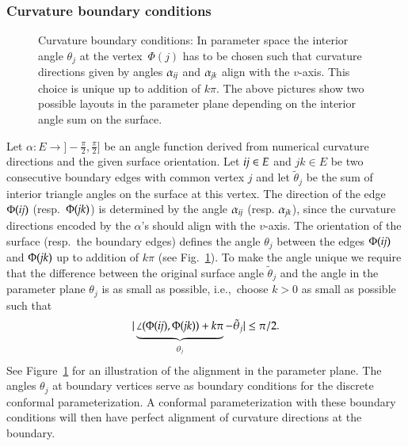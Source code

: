 \documentclass[Thesis.tex]{subfiles}
\begin{document}
\subsubsection{Curvature boundary conditions}
\label{subsub:boundary}

\begin{figure}
\centering 
\resizebox{\textwidth}{!}{}
\caption[Curvature boundary conditions]{Curvature boundary conditions: In parameter space the interior angle 
$\theta_j$ at the vertex~$\Phi(j)$ has to be chosen such that curvature 
directions given by angles $\alpha_{\mathrm{\it{ij}}}$ and $\alpha_{\mathrm{\it{jk}}}$ align with the 
$v$-axis. This choice is unique up to addition
of $k \pi$. The above pictures show two possible layouts in the parameter
plane depending on the interior angle sum on the surface.}
\label{fig:boundary_angles}
\end{figure}

Let $\alpha:E\to ]-\frac{\pi}{2},\frac{\pi}{2}]$ be an angle function derived
from numerical curvature directions and the given surface orientation. 
Let $\mathrm{\it{ij}}\in E$ and $jk\in E$ be two consecutive boundary edges with common
vertex $j$ and let $\tilde\theta_j$ be the sum of interior triangle angles on
the surface at this vertex.  The direction of the edge $\Phi(\mathrm{\it{ij}})$ (resp.\
$\Phi(\mathrm{\it{jk}})$) is determined by the angle $\alpha_{\mathrm{\it{ij}}}$ 
(resp. $\alpha_{\mathrm{\it{jk}}}$),
since the curvature directions encoded by the $\alpha$'s should align with the
$v$-axis. The orientation of the surface (resp.\ the boundary edges) defines
the angle $\theta_j$ between the edges $\Phi(\mathrm{\it{ij}})$ and $\Phi(\mathrm{\it{jk}})$ up to
addition of $k \pi$ (see Fig.~\ref{fig:boundary_angles}). To make the angle
unique we require that the difference between the original surface angle
$\tilde\theta_j$ and the angle in the parameter plane $\theta_j$ is as small
as possible, i.e.,\ choose $k>0$ as small as possible such that 
\[
|\underbrace{\angle(\Phi(\mathrm{\it{ij}}),\Phi(\mathrm{\it{jk}}))+ k \pi}_{\theta_j} - \tilde\theta_j| \le \pi/2.
\]
See Figure~\ref{fig:boundary_angles} for an
illustration of the alignment in the parameter plane. The angles $\theta_j$ at
boundary vertices serve as boundary conditions for the discrete conformal
parameterization. A conformal parameterization with these boundary conditions
will then have perfect alignment of curvature directions at the boundary.
\end{document}
